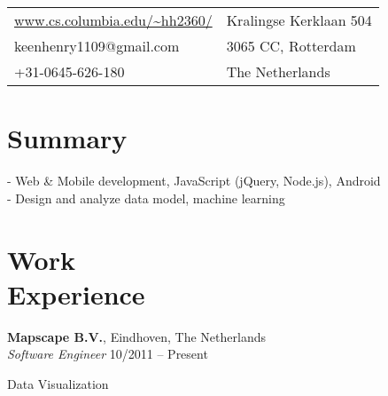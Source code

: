 \documentclass[margin,line]{resume}
\begin{document}
\begin{resume}

      \begin{tabular}{@{}p{6cm}p{8.5cm}}
      \url{www.cs.columbia.edu/~hh2360/}  &  Kralingse Kerklaan 504 \\
      keenhenry1109@gmail.com             &  3065 CC, Rotterdam \\
      +31-0645-626-180	& The Netherlands \\
      \end{tabular}

 
    \section{\mysidestyle Summary}
      - Web \& Mobile development, JavaScript (jQuery, Node.js), Android \\
      - Design and analyze data model, machine learning \\
      
    \section{\mysidestyle Work \\ Experience}

    \textbf{Mapscape B.V.}, Eindhoven, The Netherlands \\
    \textsl{Software Engineer} \hfill 10/2011 -- Present \vspace{-3mm}\\\vspace{-1mm}%
      \begin{list2}
      \item Data Visualization  %
      \end{list2}


\end{resume}
\end{document}
